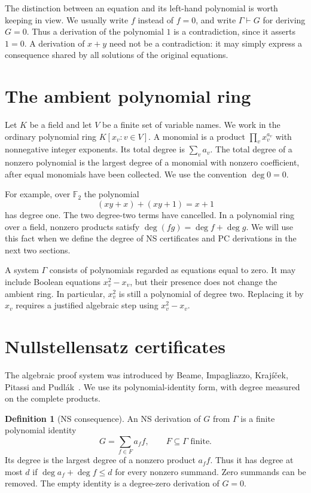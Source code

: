 \documentclass[11pt,a4paper,oneside,openany]{book}
\theoremstyle{definition}\newtheorem{definition}[theorem]{Definition}
\theoremstyle{remark}\newtheorem{remark}[theorem]{Remark}
\numberwithin{equation}{chapter}
\begin{document}
The distinction between an equation and its left-hand polynomial is
worth keeping in view. We usually write $f$ instead of $f=0$, and write
$\Gamma\vdash G$ for deriving $G=0$. Thus a derivation of the polynomial
$1$ is a contradiction, since it asserts $1=0$. A derivation of $x+y$
need not be a contradiction: it may simply express a consequence shared
by all solutions of the original equations.

\section{The ambient polynomial ring}
Let $K$ be a field and let $V$ be a finite set of variable names. We work
in the ordinary polynomial ring $K[x_v:v\in V]$. A monomial is a product
$\prod_vx_v^{a_v}$ with nonnegative integer exponents. Its total degree
is $\sum_va_v$. The total degree of a nonzero polynomial is the largest
degree of a monomial with nonzero coefficient, after equal monomials
have been collected. We use the convention $\deg0=0$.

For example, over $\mathbb F_2$ the polynomial
\[
                   (xy+x)+(xy+1)=x+1
\]
has degree one. The two degree-two terms have cancelled. In a polynomial
ring over a field, nonzero products satisfy
$\deg(fg)=\deg f+\deg g$. We will use this fact when we define the
degree of NS certificates and PC derivations in the next two sections.

A system $\Gamma$ consists of polynomials regarded as equations equal
to zero. It may include Boolean equations $x_v^2-x_v$, but their presence
does not change the ambient ring. In particular, $x_v^2$ is still a
polynomial of degree two. Replacing it by $x_v$ requires a justified
algebraic step using $x_v^2-x_v$.

\section{Nullstellensatz certificates}
The algebraic proof system was introduced by Beame, Impagliazzo,
Kraj\'i\v cek, Pitassi and Pudl\'ak~\cite{NSFoundations}. We use its
polynomial-identity form, with degree measured on the complete products.
\begin{definition}[NS consequence]\label{tx:def:NS}
An NS derivation of $G$ from $\Gamma$ is a finite polynomial identity
\begin{equation}\label{tx:eq:NS}
                         G=\sum_{f\in F}a_ff,
                   \qquad F\subseteq\Gamma\text{ finite}.
\end{equation}
Its degree is the largest degree of a nonzero product $a_ff$.
Thus it has degree at most $d$ if
$\deg a_f+\deg f\le d$ for every nonzero summand. Zero summands can be
removed. The empty identity is a degree-zero derivation of $G=0$.
\end{definition}
\end{document}
